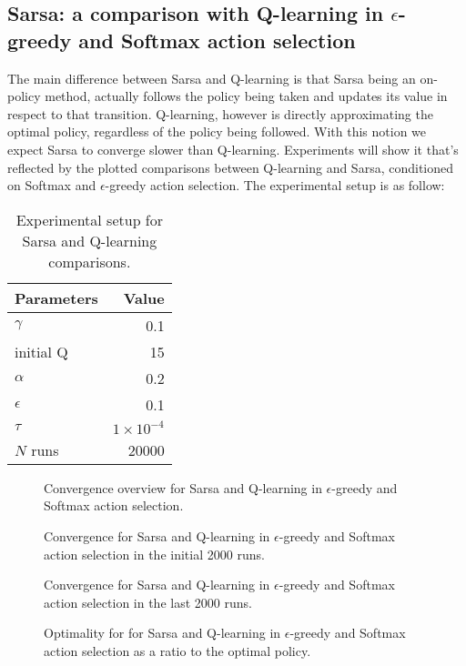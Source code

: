 \documentclass[paper=a4, fontsize=11pt]{scrartcl}
\numberwithin{equation}{section}		%
\numberwithin{figure}{section}			%
\numberwithin{table}{section}				%
\begin{document}
\subsection{Sarsa: a comparison with Q-learning in $\epsilon$-greedy and Softmax action selection}
The main difference between Sarsa and Q-learning is that Sarsa being an on-policy method, actually follows the policy being taken and updates its value in respect to that transition. Q-learning, however is directly approximating the optimal policy, regardless of the policy being followed. With this notion we expect Sarsa to converge slower than Q-learning. Experiments will show it that's reflected by the plotted comparisons between Q-learning and Sarsa, conditioned on Softmax and $\epsilon$-greedy action selection. The experimental setup is as follow:
\begin{table}[H]
\caption{Experimental setup for Sarsa and Q-learning comparisons.}
\centering
\begin{tabular}{|l|r|}
\hline
Parameters & Value \\\hline
$\gamma$ & 0.1 \\\hline
initial Q & 15 \\\hline
$\alpha$ & 0.2\\\hline
$\epsilon$ & 0.1\\\hline
$\tau$ & $1 \times 10^{-4}$\\\hline
$N$ runs & 20000\\\hline
\end{tabular}
\label{expSetupSarsa}
\end{table}
\begin{figure}[H] \centering
\caption{Convergence overview for Sarsa and Q-learning in $\epsilon$-greedy and Softmax action selection.} 
\label{figure:sarsaOverview}
\end{figure}
\begin{figure}[H] \centering
\caption{Convergence for Sarsa and Q-learning in $\epsilon$-greedy and Softmax action selection in the initial 2000 runs.} 
\label{figure:sarsafirst20}
\end{figure}
\begin{figure}[H] \centering
\caption{Convergence for Sarsa and Q-learning in $\epsilon$-greedy and Softmax action selection in the last 2000 runs.} 
\label{figure:sarsalast20}
\end{figure}
\begin{figure}[H] \centering
\caption{Optimality for for Sarsa and Q-learning in $\epsilon$-greedy and Softmax action selection as a ratio to the optimal policy.} 
\label{figure:sarsaOpti}
\end{figure}
\end{document}
